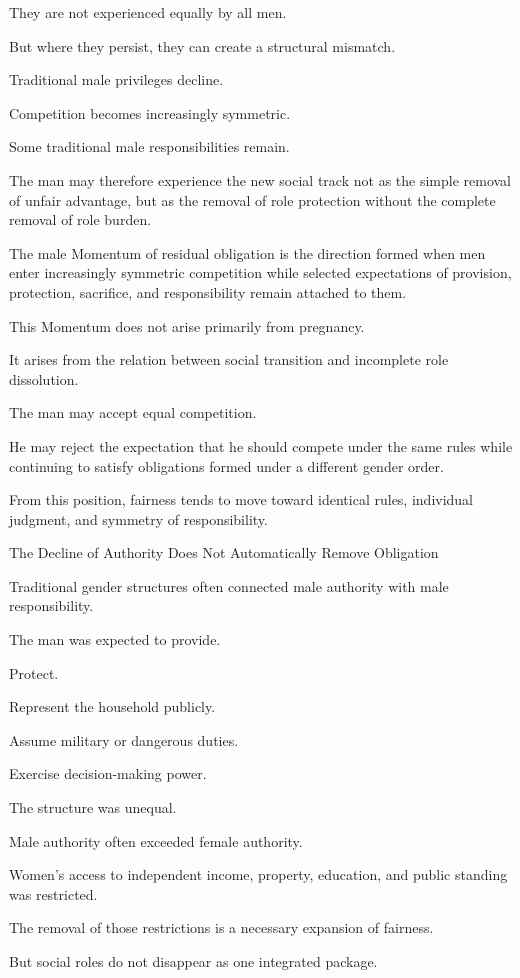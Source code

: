 They are not experienced equally by all men.

But where they persist, they can create a structural mismatch.

Traditional male privileges decline.

Competition becomes increasingly symmetric.

Some traditional male responsibilities remain.

The man may therefore experience the new social track not as the simple removal of unfair advantage, but as the removal of role protection without the complete removal of role burden.

The male Momentum of residual obligation is the direction formed when men enter increasingly symmetric competition while selected expectations of provision, protection, sacrifice, and responsibility remain attached to them.

This Momentum does not arise primarily from pregnancy.

It arises from the relation between social transition and incomplete role dissolution.

The man may accept equal competition.

He may reject the expectation that he should compete under the same rules while continuing to satisfy obligations formed under a different gender order.

From this position, fairness tends to move toward identical rules, individual judgment, and symmetry of responsibility.

The Decline of Authority Does Not Automatically Remove Obligation

Traditional gender structures often connected male authority with male responsibility.

The man was expected to provide.

Protect.

Represent the household publicly.

Assume military or dangerous duties.

Exercise decision-making power.

The structure was unequal.

Male authority often exceeded female authority.

Women’s access to independent income, property, education, and public standing was restricted.

The removal of those restrictions is a necessary expansion of fairness.

But social roles do not disappear as one integrated package.

